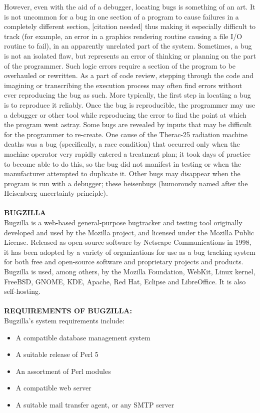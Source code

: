 However, even with the aid of a debugger, locating bugs is something of an art. It is not uncommon for a bug in one section of a program to cause failures in a completely different section, [citation needed] thus making it especially difficult to track (for example, an error in a graphics rendering routine causing a file I/O routine to fail), in an apparently unrelated part of the system.
Sometimes, a bug is not an isolated flaw, but represents an error of thinking or planning on the part of the programmer. Such logic errors require a section of the program to be overhauled or rewritten. As a part of code review, stepping through the code and imagining or transcribing the execution process may often find errors without ever reproducing the bug as such.
More typically, the first step in locating a bug is to reproduce it reliably. Once the bug is reproducible, the programmer may use a debugger or other tool while reproducing the error to find the point at which the program went astray.
Some bugs are revealed by inputs that may be difficult for the programmer to re-create. One cause of the Therac-25 radiation machine deaths was a bug (specifically, a race condition) that occurred only when the machine operator very rapidly entered a treatment plan; it took days of practice to become able to do this, so the bug did not manifest in testing or when the manufacturer attempted to duplicate it. Other bugs may disappear when the program is run with a debugger; these heisenbugs (humorously named after the Heisenberg uncertainty principle).\\\\
\textbf{BUGZILLA}\\
Bugzilla is a web-based general-purpose bugtracker and testing tool originally developed and used by the Mozilla project, and licensed under the Mozilla Public License.
Released as open-source software by Netscape Communications in 1998, it has been adopted by a variety of organizations for use as a bug tracking system for both free and open-source software and proprietary projects and products. Bugzilla is used, among others, by the Mozilla Foundation, WebKit, Linux kernel, FreeBSD, GNOME, KDE, Apache, Red Hat, Eclipse and LibreOffice. It is also self-hosting.\\\\
\textbf{REQUIREMENTS OF BUGZILLA:}\\
Bugzilla's system requirements include:
\begin{itemize}
\item A compatible database management system
\item A suitable release of Perl 5
\item An assortment of Perl modules
\item A compatible web server
\item A suitable mail transfer agent, or any SMTP server
\end{itemize}
